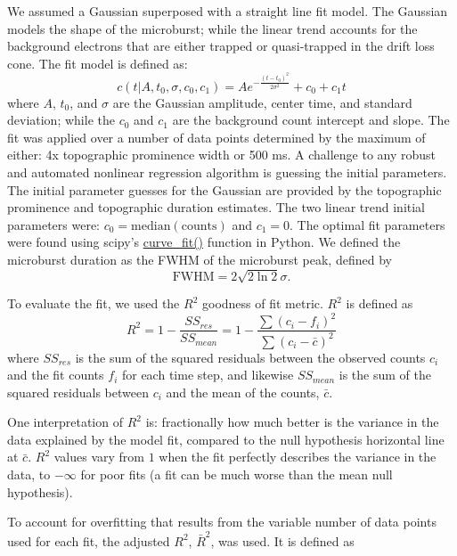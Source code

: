 \documentclass[draft]{agujournal2019}
\begin{document}
We assumed a Gaussian superposed with a straight line fit model. The Gaussian models the shape of the microburst; while the linear trend accounts for the background electrons that are either trapped or quasi-trapped in the drift loss cone. The fit model is defined as:
\begin{equation}
c(t | A, t_0, \sigma, c_0, c_1) = A e^{-\frac{(t-t_0)^2}{2\sigma^2}} + c_0 + c_1 t
\end{equation} where $A$, $t_0$, and $\sigma$ are the Gaussian amplitude, center time, and standard deviation; while the $c_0$ and $c_1$ are the background count intercept and slope. The fit was applied over a number of data points determined by the maximum of either: 4x topographic prominence width or 500 ms. A challenge to any robust and automated nonlinear regression algorithm is guessing the initial parameters. The initial parameter guesses for the Gaussian are provided by the topographic prominence and topographic duration estimates. The two linear trend initial parameters were: $c_0=\mathrm{median(counts)}$ and $c_1=0$. The optimal fit parameters were found using scipy's \url{curve_fit()} function in Python. We defined the microburst duration as the FWHM of the microburst peak, defined by
\begin{equation}
\mathrm{FWHM} = 2\sqrt{2 \ln{2}} \sigma.
\end{equation}

To evaluate the fit, we used the $R^2$ goodness of fit metric. $R^2$ is defined as
\begin{equation}
R^2 = 1 - \frac{SS_{res}}{SS_{mean}} = 1 - \frac{\sum{(c_i-f_i)^2}}{\sum{(c_i-\bar{c})^2}}
\end{equation} where $SS_{res}$ is the sum of the squared residuals between the observed counts $c_i$ and the fit counts $f_i$ for each time step, and likewise $SS_{mean}$ is the sum of the squared residuals between $c_i$ and the mean of the counts, $\bar{c}$.

One interpretation of $R^2$ is: fractionally how much better is the variance in the data explained by the model fit, compared to the null hypothesis horizontal line at $\bar{c}$. $R^2$ values vary from $1$ when the fit perfectly describes the variance in the data, to $-\infty$ for poor fits (a fit can be much worse than the mean null hypothesis).

To account for overfitting that results from the variable number of data points used for each fit, the adjusted $R^2$, $\bar{R}^2$, was used. It is defined as
\end{document}
